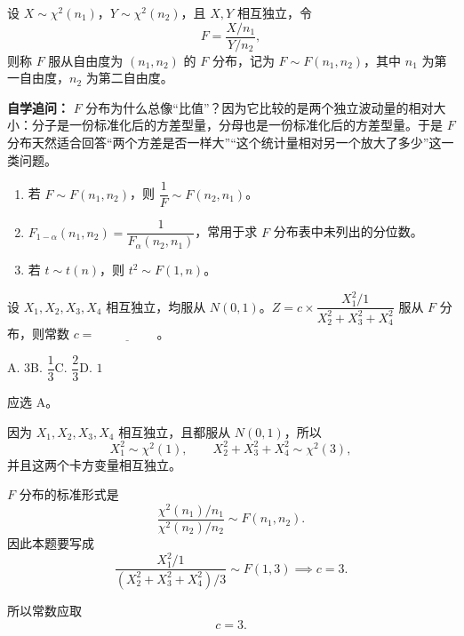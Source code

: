 ﻿\documentclass[lang=cn,11pt]{elegantbook}
\begin{document}
\begin{definition}[\texorpdfstring{\(F\)}{F} 分布] \label{def:f-dist}
设 \(X \sim \chi^2(n_1)\)，\(Y \sim \chi^2(n_2)\)，且 \(X, Y\) 相互独立，令
\[
F = \frac{X/n_1}{Y/n_2},
\]
则称 \(F\) 服从自由度为 \((n_1, n_2)\) 的 \(F\) 分布，记为 \(F \sim F(n_1, n_2)\)，其中 \(n_1\) 为第一自由度，\(n_2\) 为第二自由度。
\end{definition}

\begin{note}
\textbf{自学追问：} \(F\) 分布为什么总像“比值”？因为它比较的是两个独立波动量的相对大小：分子是一份标准化后的方差型量，分母也是一份标准化后的方差型量。于是 \(F\) 分布天然适合回答“两个方差是否一样大”“这个统计量相对另一个放大了多少”这一类问题。
\end{note}

\begin{property}\label{prop:f-dist-property}
\begin{enumerate}
    \item 若 \(F \sim F(n_1, n_2)\)，则 \(\dfrac{1}{F} \sim F(n_2, n_1)\)。
    \item \(F_{1-\alpha}(n_1, n_2) = \dfrac{1}{F_\alpha(n_2, n_1)}\)，常用于求 \(F\) 分布表中未列出的分位数。
    \item 若 \(t \sim t(n)\)，则 \(t^2 \sim F(1, n)\)。
\end{enumerate}
\end{property}

\begin{exercise}\label{exer:6-f-const}
设 \(X_1, X_2, X_3, X_4\) 相互独立，均服从 \(N(0,1)\)。\(Z = c \times \dfrac{X_1^2/1}{X_2^2+X_3^2+X_4^2}\) 服从 \(F\) 分布，则常数 \(c =\,\underline{\hspace{2cm}}\)。\par
A. \(3\)\quad B. \(\dfrac{1}{3}\)\quad C. \(\dfrac{2}{3}\)\quad D. \(1\)
\end{exercise}
\begin{solution}
应选 A。

因为 \(X_1,X_2,X_3,X_4\) 相互独立，且都服从 \(N(0,1)\)，所以
\[
X_1^2 \sim \chi^2(1),
\qquad
X_2^2+X_3^2+X_4^2 \sim \chi^2(3),
\]
并且这两个卡方变量相互独立。

\(F\) 分布的标准形式是
\[
\frac{\chi^2(n_1)/n_1}{\chi^2(n_2)/n_2}\sim F(n_1,n_2).
\]
因此本题要写成
\[
\frac{X_1^2/1}{(X_2^2+X_3^2+X_4^2)/3} \sim F(1,3) \implies c = 3.
\]

所以常数应取
\[
c=3.
\]
\end{solution}
\end{document}
